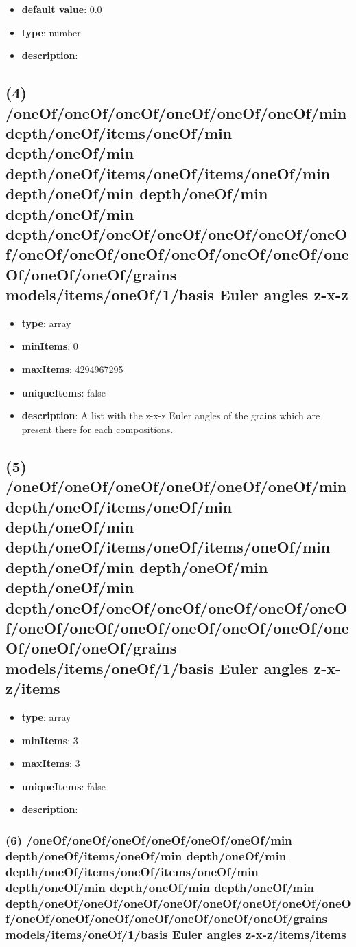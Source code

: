 \begin{itemize}[leftmargin=7em]\item {\bf default value}: 0.0
\item {\bf type}: number
\item {\bf description}: 
\end{itemize}\subsection{(4) /oneOf/oneOf/oneOf/oneOf/oneOf/oneOf/min depth/oneOf/items/oneOf/min depth/oneOf/min depth/oneOf/items/oneOf/items/oneOf/min depth/oneOf/min depth/oneOf/min depth/oneOf/min depth/oneOf/oneOf/oneOf/oneOf/oneOf/oneOf/oneOf/oneOf/oneOf/oneOf/oneOf/oneOf/oneOf/oneOf/oneOf/grains models/items/oneOf/1/basis Euler angles z-x-z}
\begin{itemize}[leftmargin=4em]\item {\bf type}: array
\item {\bf minItems}: 0
\item {\bf maxItems}: 4294967295
\item {\bf uniqueItems}: false
\item {\bf description}: A list with the z-x-z Euler angles of the grains which are present there for each compositions.
\end{itemize}\subsection{(5) /oneOf/oneOf/oneOf/oneOf/oneOf/oneOf/min depth/oneOf/items/oneOf/min depth/oneOf/min depth/oneOf/items/oneOf/items/oneOf/min depth/oneOf/min depth/oneOf/min depth/oneOf/min depth/oneOf/oneOf/oneOf/oneOf/oneOf/oneOf/oneOf/oneOf/oneOf/oneOf/oneOf/oneOf/oneOf/oneOf/oneOf/grains models/items/oneOf/1/basis Euler angles z-x-z/items}
\begin{itemize}[leftmargin=5em]\item {\bf type}: array
\item {\bf minItems}: 3
\item {\bf maxItems}: 3
\item {\bf uniqueItems}: false
\item {\bf description}: 
\end{itemize}\subsubsection{(6) /oneOf/oneOf/oneOf/oneOf/oneOf/oneOf/min depth/oneOf/items/oneOf/min depth/oneOf/min depth/oneOf/items/oneOf/items/oneOf/min depth/oneOf/min depth/oneOf/min depth/oneOf/min depth/oneOf/oneOf/oneOf/oneOf/oneOf/oneOf/oneOf/oneOf/oneOf/oneOf/oneOf/oneOf/oneOf/oneOf/oneOf/grains models/items/oneOf/1/basis Euler angles z-x-z/items/items}
